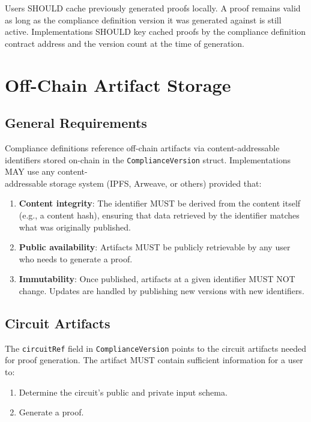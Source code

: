 \documentclass[9pt]{extreport}
\begin{document}
Users SHOULD cache previously generated proofs locally. A proof remains valid as long as the compliance definition version it was generated against is still active. Implementations SHOULD key cached proofs by the compliance definition contract address and the version count at the time of generation.

\section{Off-Chain Artifact Storage}
\label{sec:off-chain-storage}

\subsection{General Requirements}
\label{sec:storage-general-requirements}

Compliance definitions reference off-chain artifacts via content-addressable identifiers stored on-chain in the \texttt{ComplianceVersion} struct. Implementations MAY use any content-\\addressable storage system (IPFS, Arweave, or others) provided that:

\begin{enumerate}
    \item \textbf{Content integrity}: The identifier MUST be derived from the content itself (e.g., a content hash), ensuring that data retrieved by the identifier matches what was originally published.
    \item \textbf{Public availability}: Artifacts MUST be publicly retrievable by any user who needs to generate a proof.
    \item \textbf{Immutability}: Once published, artifacts at a given identifier MUST NOT change. Updates are handled by publishing new versions with new identifiers.
\end{enumerate}

\subsection{Circuit Artifacts}
\label{sec:circuit-artifacts}

The \texttt{circuitRef} field in \texttt{ComplianceVersion} points to the circuit artifacts needed for proof generation. The artifact MUST contain sufficient information for a user to:

\begin{enumerate}
    \item Determine the circuit's public and private input schema.
    \item Generate a proof.
\end{enumerate}
\end{document}
